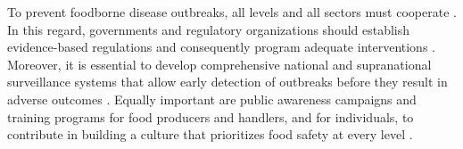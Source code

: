 To prevent foodborne disease outbreaks, all levels and all sectors must
cooperate \citep{graceFood2017}. In this regard, governments and regulatory
organizations should establish evidence-based regulations and consequently
program adequate interventions \citep{faoWorking2007}. Moreover, it is essential
to develop comprehensive national and supranational surveillance systems that
allow early detection of outbreaks before they result in adverse outcomes
\citep{faoCodex2009}. Equally important are public awareness campaigns and
training programs for food producers and handlers, and for individuals, to
contribute in building a culture that prioritizes food safety at every level
\citep{bosmanExpertise2016}.
